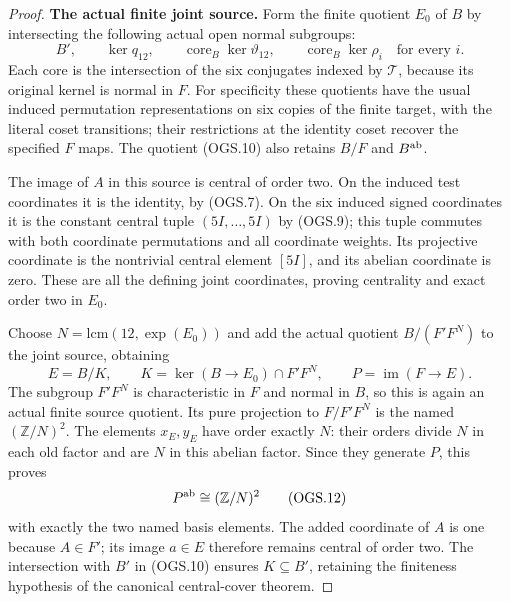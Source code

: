 \begin{proof}
\par\medskip\noindent\textbf{The actual finite joint source.}\quad
Form the finite quotient $E_0$ of $B$ by intersecting
the following actual open normal subgroups:
\[
 B',\qquad \ker q_{12},\qquad
 \operatorname{core}_B\ker\vartheta_{12},\qquad
 \operatorname{core}_B\ker\rho_i\quad\text{for every }i.
                                                               \tag{OGS.10}
\]
Each core is the intersection of the six conjugates
indexed by $\mathcal T$, because its original kernel
is normal in $F$.
For specificity these quotients have the usual
induced permutation representations on six copies
of the finite target, with the literal coset transitions;
their restrictions at the identity coset recover the
specified $F$ maps.
The quotient (OGS.10) also retains $B/F$ and $B^{\rm ab}$.

The image of $A$ in this source is central of order
two.  On the induced test coordinates it is the
identity, by (OGS.7).  On the six induced signed
coordinates it is the constant central tuple
$(5I,\ldots,5I)$ by (OGS.9); this tuple commutes
with both coordinate permutations and all coordinate
weights.  Its projective coordinate is the nontrivial
central element $[5I]$, and its abelian coordinate
is zero.  These are all the defining joint coordinates,
proving centrality and exact order two in $E_0$.

Choose
$N=\mathrm{lcm}(12,\exp(E_0))$ and add the actual
quotient $B/(F'F^N)$ to the joint source, obtaining
\[
 E=B/K,\qquad
 K=\ker(B\to E_0)\cap F'F^N,\qquad P=\operatorname{im}(F\to E).
                                                               \tag{OGS.11}
\]
The subgroup $F'F^N$ is characteristic in $F$ and
normal in $B$, so this is again an actual finite
source quotient.  Its pure projection to
$F/F'F^N$ is the named $(\mathbb Z/N)^2$.
The elements $x_E,y_E$ have order exactly $N$:
their orders divide $N$ in each old factor and
are $N$ in this abelian factor.
Since they generate $P$, this proves
\[
                 P^{\rm ab}\cong(\mathbb Z/N)^2
                                                               \tag{OGS.12}
\]
with exactly the two named basis elements.
The added coordinate of $A$ is one because $A\in F'$;
its image $a\in E$ therefore remains central of order two.
The intersection with $B'$ in (OGS.10) ensures
$K\subseteq B'$, retaining the finiteness hypothesis
of the canonical central-cover theorem.


\end{proof}
